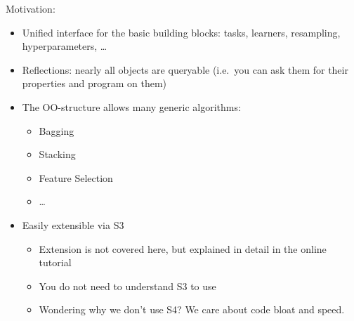 \begin{vframe}{Motivation: }
  \begin{itemize}
    \item Unified interface for the basic building blocks: tasks, learners, resampling, hyperparameters, \ldots
    \item Reflections: nearly all objects are queryable (i.e.\ you can ask them for their properties and program on them)
    \item The OO-structure allows many generic algorithms:
      \begin{itemize}
        \item Bagging
        \item Stacking
        \item Feature Selection
        \item \ldots
      \end{itemize}
    \item Easily extensible via S3
      \begin{itemize}
        \item Extension is not covered here, but explained in detail in the online tutorial
        \item You do not need to understand S3 to use 
        \item Wondering why we don't use S4? We care about code bloat and speed.
      \end{itemize}
  \end{itemize}
\end{vframe}









